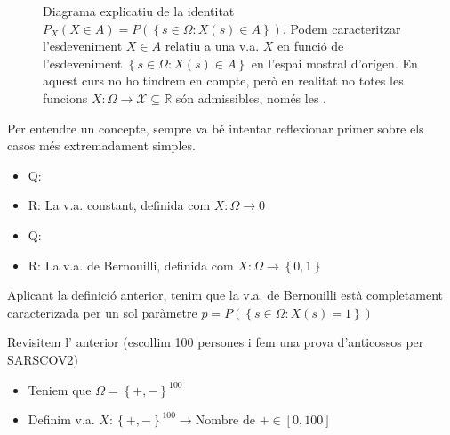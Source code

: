 \documentclass[letterpaper,10pt,english]{sphinxmanual}
\let\sphinxpxdimen\pdfpxdimen\else\newdimen\sphinxpxdimen
\begin{document}
\begin{figure}[htbp]
\centering
\capstart

\noindent\sphinxincludegraphics[height=300\sphinxpxdimen]{{v.a}.png}
\caption{Diagrama explicatiu de la identitat \(P_X\left(X \in A\right) = P\left(\left\{s\in \Omega: X\left(s\right) \in A \right\}\right)\).
Podem caracteritzar l’esdeveniment \(X \in A\) relatiu a una v.a. \(X\) en funció de l’esdeveniment \(\left\{s\in \Omega: X\left(s\right) \in A \right\}\)
en l’espai mostral d’orígen. En aquest curs no ho tindrem en compte, però en realitat
no totes les funcions \(X : \Omega \to \mathcal{X} \subseteq \mathbb{R}\) són admissibles,
només les .}\label{\detokenize{0_Intro/0_1_Repas_probabilitat:id4}}\end{figure}

Per entendre un concepte, sempre va bé intentar reflexionar primer sobre
els casos més extremadament simples.
\begin{itemize}
\item {} 
Q:

\item {} 
R: La v.a. constant, definida com \(X : \Omega \to 0\)

\item {} 
Q: 

\item {} 
R: La v.a. de Bernouilli, definida com \(X : \Omega \to \left\{0, 1\right\}\)

\end{itemize}

Aplicant la definició anterior, tenim que la v.a. de Bernouilli està completament
caracterizada per un sol paràmetre \(p = P\left(\left\{s\in \Omega: X\left(s\right) = 1\right\}\right)\)

Revisitem l’ anterior (escollim 100 persones i fem una prova d’anticossos per SARS\sphinxhyphen{}COV\sphinxhyphen{}2)
\begin{itemize}
\item {} 
Teniem que \(\Omega = \left\{+, -\right\}^{100}\)

\item {} 
Definim v.a. \(X : \left\{+, -\right\}^{100} \to \mbox{Nombre de +} \in \left[0, 100\right]\)

\end{itemize}
\end{document}
